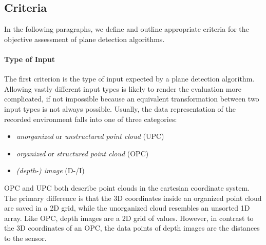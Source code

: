 \documentclass[main.tex]{subfiles}
\begin{document}
\subsection{Criteria}
In the following paragraphs, we define and outline appropriate criteria for the objective assessment of plane detection algorithms.

\paragraph{Type of Input}\label{par:input}
The first criterion is the type of input expected by a plane detection algorithm.
Allowing vastly different input types is likely to render the evaluation more complicated, if not impossible because an equivalent transformation
between two input types is not always possible. 
Usually, the data representation of the recorded environment falls into one of three categories:
\begin{itemize}
    \item \textit{unorganized} or \textit{unstructured point cloud} (UPC)
    \item \textit{organized} or \textit{structured point cloud} (OPC)
    \item \textit{(depth-) image} (D-/I)
\end{itemize}

OPC and UPC both describe point clouds in the cartesian coordinate system. The primary difference is that the 3D coordinates inside
an organized point cloud are saved in a 2D grid, while the unorganized cloud resembles an unsorted 1D array.
Like OPC, depth images are a 2D grid of values. However, in contrast to the 3D coordinates of an OPC, the data points of depth images
are the distances to the sensor.
\end{document}
